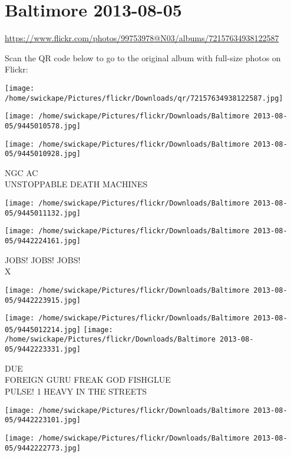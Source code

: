 \documentclass[10pt,letterpaper]{article}
\title{}
\author{}
\date{}
\begin{document}
\section*{Baltimore 2013-08-05}

\url{https://www.flickr.com/photos/99753978@N03/albums/72157634938122587}

Scan the QR code below to go to the original album with full-size photos on Flickr:

\texttt{[image: /home/swickape/Pictures/flickr/Downloads/qr/72157634938122587.jpg]}
\pagebreak

\texttt{[image: /home/swickape/Pictures/flickr/Downloads/Baltimore 2013-08-05/9445010578.jpg]}

\vspace{0.25in}
\texttt{[image: /home/swickape/Pictures/flickr/Downloads/Baltimore 2013-08-05/9445010928.jpg]}

NGC AC\\
UNSTOPPABLE DEATH MACHINES
\pagebreak

\texttt{[image: /home/swickape/Pictures/flickr/Downloads/Baltimore 2013-08-05/9445011132.jpg]}

\vspace{0.25in}
\texttt{[image: /home/swickape/Pictures/flickr/Downloads/Baltimore 2013-08-05/9442224161.jpg]}

JOBS! JOBS! JOBS!\\
X
\pagebreak

\texttt{[image: /home/swickape/Pictures/flickr/Downloads/Baltimore 2013-08-05/9442223915.jpg]}

\vspace{0.25in}
\texttt{[image: /home/swickape/Pictures/flickr/Downloads/Baltimore 2013-08-05/9445012214.jpg]}
\texttt{[image: /home/swickape/Pictures/flickr/Downloads/Baltimore 2013-08-05/9442223331.jpg]}

DUE\\
FOREIGN GURU FREAK GOD FISHGLUE\\
PULSE! 1 HEAVY IN THE STREETS
\pagebreak

\texttt{[image: /home/swickape/Pictures/flickr/Downloads/Baltimore 2013-08-05/9442223101.jpg]}

\vspace{0.25in}
\texttt{[image: /home/swickape/Pictures/flickr/Downloads/Baltimore 2013-08-05/9442222773.jpg]}
\end{document}
